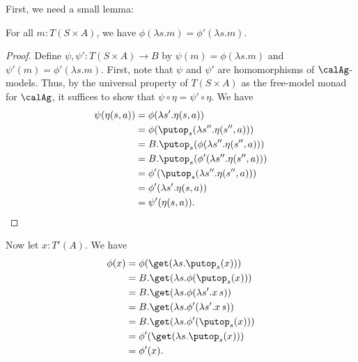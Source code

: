 First, we need a small lemma:
\begin{lemma}
    For all $m : T(S \times A)$, we have $\phi(\lambda s.m) = \phi'(\lambda s.m)$.
\end{lemma}
\begin{proof}
    Define $\psi, \psi' : T(S \times A) \to B$ by $\psi(m) = \phi(\lambda s.m)$
    and $\psi'(m) = \phi'(\lambda s.m)$. First, note that $\psi$ and $\psi'$ are
    homomorphisms of $\calAg$-models.
    Thus, by the universal property of $T(S \times A)$ as the free-model monad
    for $\calAg$, it suffices to show that $\psi \circ \eta = \psi' \circ \eta$.
    We have
    \begin{align*}
        \psi(\eta(s,a)) 
        &= \phi(\lambda s'.\eta(s, a)) \\
        &= \phi(\putop_s (\lambda s''.\eta(s'', a))) \\
        &= B.\putop_s(\phi(\lambda s''.\eta(s'', a))) \\
        &= B.\putop_s(\phi'(\lambda s''.\eta(s'', a))) \\
        &= \phi'(\putop_s(\lambda s''.\eta(s'', a))) \\
        &= \phi'(\lambda s'.\eta(s, a)) \\
        &= \psi'(\eta(s,a)).
    \end{align*}
\end{proof}

Now let $x : T'(A)$. We have
\begin{align*}
    \phi(x)
    &= \phi(\get(\lambda s. \putop_s(x))) \\
    &= B.\get(\lambda s. \phi(\putop_s(x))) \\
    &= B.\get(\lambda s. \phi(\lambda s'. x\, s)) \\
    &= B.\get(\lambda s. \phi'(\lambda s'. x\, s)) \\
    &= B.\get(\lambda s. \phi'(\putop_s(x))) \\
    &= \phi'(\get(\lambda s.\putop_s(x))) \\
    &= \phi'(x).
\end{align*}

